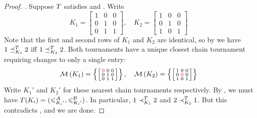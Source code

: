 \begin{proof}
    \iim{}. Suppose $T$ satisfies \chainmin{} and
    \iim{}. Write
    \[
         K_1 = \left[\begin{smallmatrix}
            1 & 0 & 0 \\
            0 & 1 & 0 \\
            0 & 1 & 1
         \end{smallmatrix}\right]
         , \quad
         K_2 = \left[\begin{smallmatrix}
            1 & 0 & 0 \\
            0 & 1 & 0 \\
            1 & 0 & 1
         \end{smallmatrix}\right]
    \]
    Note that the first and second rows of $K_1$ and $K_2$ are identical, so by
    \iim{} we have $1 \preceq_{K_1}^T 2$ iff $1 \preceq_{K_2}^T 2$.
    Both tournaments have a unique closest chain tournament requiring changes
    to only a single entry:
    \[
        \operatorname{\mathcal{M}}\left({K_1}\right) = \left\{
            \left[\begin{smallmatrix}
               \color{red}{0} & 0 & 0 \\
               0 & 1 & 0 \\
               0 & 1 & 1
            \end{smallmatrix}\right]
        \right\}
        , \quad
        \operatorname{\mathcal{M}}\left({K_2}\right) = \left\{
            \left[\begin{smallmatrix}
               1 & 0 & 0 \\
               0 & \color{red}{0} & 0 \\
               1 & 0 & 1
            \end{smallmatrix}\right]
        \right\}
    \]
    Write ${K_1}'$ and ${K_2}'$ for these nearest chain tournaments
    respectively. By \chainmin{}, we must have $T(K_i) =
    ({\leqslant^{\mathcal{A}}_{{K_i}'}}, {\leqslant^{\mathcal{B}}_{{K_i}'}})$. In particular, $1
    \prec_{K_1}^T 2$ and $2 \prec_{K_2}^T 1$. But this contradicts
    \iim{}, and we are done.


\end{proof}
